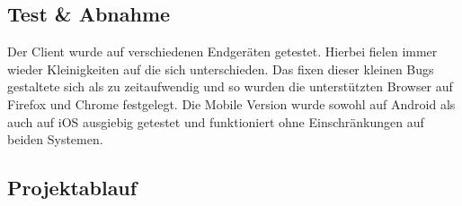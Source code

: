 \subsection{Test \& Abnahme}
Der Client wurde auf verschiedenen Endgeräten getestet. Hierbei fielen
immer wieder Kleinigkeiten auf die sich unterschieden. Das fixen
dieser kleinen Bugs gestaltete sich als zu zeitaufwendig und so wurden
die unterstützten Browser auf Firefox und Chrome festgelegt.
Die Mobile Version wurde sowohl auf Android als auch auf iOS ausgiebig
getestet und funktioniert ohne Einschränkungen auf beiden Systemen.
\subsection{Projektablauf}

